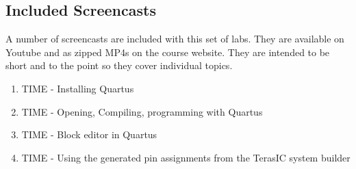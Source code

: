     \subsection{Included Screencasts}
      A number of screencasts are included with this set of labs. They are available on Youtube and as zipped MP4s on the course website. They are intended to be short and to the point so they cover individual topics.
      \begin{enumerate}
        \item TIME - Installing Quartus
        \item TIME - Opening, Compiling, programming with Quartus
        \item TIME - Block editor in Quartus
        \item TIME - Using the generated pin assignments from the TerasIC system builder
      \end{enumerate}

